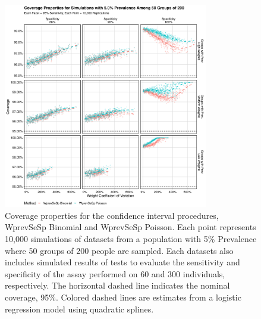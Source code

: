 \documentclass[AMA,STIX1COL]{WileyNJD-v2}
\begin{document}
\begin{figure}
\centering
\includegraphics[width=0.8\textwidth]{figures/imperfect_coverage_50_groups_0_05_prev.pdf}
\caption{Coverage properties for the confidence interval procedures, WprevSeSp Binomial and WprevSeSp Poisson.
Each point represents 10,000 simulations of datasets from a population with 5\% Prevalence where 50 groups of 200 people are sampled.
Each datasets also includes simulated results of tests to evaluate the sensitivity and specificity of the assay performed on 60 and 300 individuals, respectively.
The horizontal dashed line indicates the nominal coverage, 95\%.
Colored dashed lines are estimates from a logistic regression model using quadratic splines.}
\label{fig:imperfect_coverage_50_groups_0_05_prev}
\end{figure}
\end{document}
